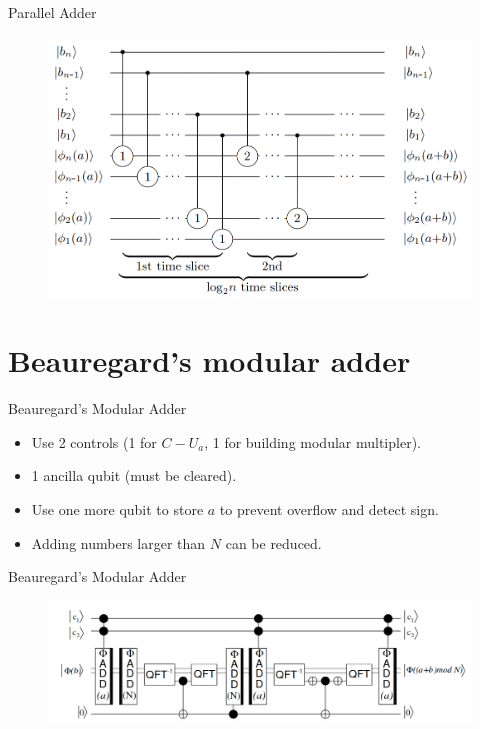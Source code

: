 \documentclass{beamer}
\begin{document}
\begin{frame}{Parallel Adder}
	\begin{figure}[h]
		\centering
		\includegraphics[width=\linewidth]{./paralleladder.png}
	\end{figure}
	
\end{frame}

\section{Beauregard's modular adder}%
\label{sec:beauregard_s_modular_adder}

\begin{frame}{Beauregard's Modular Adder}
	\begin{itemize}
		\item Use 2 controls (1 for $C-U_a$, 1 for building modular multipler).
		\item 1 ancilla qubit (must be cleared).
		\item Use one more qubit to store $a$ to prevent overflow and detect sign.
		\item Adding numbers larger than $N$ can be reduced.
	\end{itemize}
	
\end{frame}

\begin{frame}{Beauregard's Modular Adder}
	\begin{figure}[h]
		\centering
		\includegraphics[width=\linewidth]{./beauregard_adder.png}
	\end{figure}
\end{frame}
\end{document}
